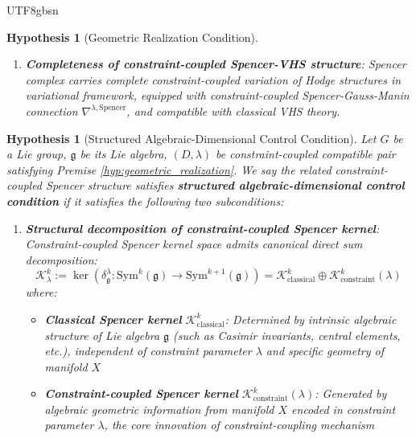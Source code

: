 \documentclass[a4paper,12pt]{extarticle}
\newtheorem{hypothesis}[theorem]{Hypothesis}
\theoremstyle{definition}
\begin{document}
\begin{CJK}{UTF8}{gbsn}
\begin{hypothesis}[Geometric Realization Condition]
\begin{enumerate}
\begin{align}
    \mathcal{S}^k_\lambda &= \Omega^k(X) \otimes \text{Sym}^k(\mathfrak{g}) \label{eq:spencer_complex_definition}\\
    \delta^\lambda: \mathcal{S}^k_\lambda &\to \mathcal{S}^{k+1}_\lambda \label{eq:spencer_differential}
    \end{align}
    where constraint-coupled Spencer differential operator $\delta^\lambda$ has elliptic properties and $(\delta^\lambda)^2 = 0$.
    \item \textbf{Completeness of constraint-coupled Spencer-VHS structure}: Spencer complex carries complete constraint-coupled variation of Hodge structures in variational framework, equipped with constraint-coupled Spencer-Gauss-Manin connection $\nabla^{\lambda,\text{Spencer}}$, and compatible with classical VHS theory.
\end{enumerate}
\end{hypothesis}

\begin{hypothesis}[Structured Algebraic-Dimensional Control Condition]
\label{hyp:structured_algebraic_control}
Let $G$ be a Lie group, $\mathfrak{g}$ be its Lie algebra, $(D, \lambda)$ be constraint-coupled compatible pair satisfying Premise \ref{hyp:geometric_realization}. We say the related constraint-coupled Spencer structure satisfies \textbf{structured algebraic-dimensional control condition} if it satisfies the following two subconditions:

\begin{enumerate}
    \item \textbf{Structural decomposition of constraint-coupled Spencer kernel}: Constraint-coupled Spencer kernel space admits canonical direct sum decomposition:
    \begin{equation}
    \label{eq:spencer_kernel_decomposition}
    \mathcal{K}^k_\lambda := \ker(\delta^\lambda_\mathfrak{g}: \text{Sym}^k(\mathfrak{g}) \to \text{Sym}^{k+1}(\mathfrak{g})) = \mathcal{K}^k_{\text{classical}} \oplus \mathcal{K}^k_{\text{constraint}}(\lambda)
    \end{equation}
    where:
    \begin{itemize}
        \item \textbf{Classical Spencer kernel} $\mathcal{K}^k_{\text{classical}}$: Determined by intrinsic algebraic structure of Lie algebra $\mathfrak{g}$ (such as Casimir invariants, central elements, etc.), independent of constraint parameter $\lambda$ and specific geometry of manifold $X$
        \item \textbf{Constraint-coupled Spencer kernel} $\mathcal{K}^k_{\text{constraint}}(\lambda)$: Generated by algebraic geometric information from manifold $X$ encoded in constraint parameter $\lambda$, the core innovation of constraint-coupling mechanism
    \end{itemize}
    

\end{enumerate}
\end{hypothesis}
\end{CJK}
\end{document}
